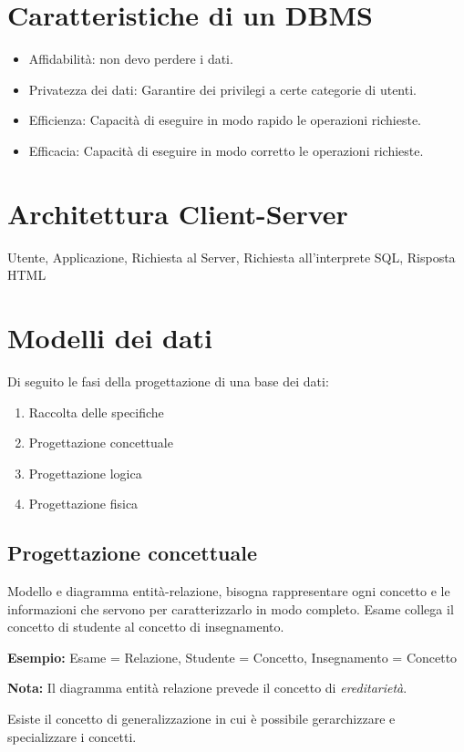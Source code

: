 \documentclass{article}
\begin{document}
\section{Caratteristiche di un DBMS}
\begin{itemize}
  \item Affidabilità: non devo perdere i dati.
  \item Privatezza dei dati: Garantire dei privilegi a certe categorie di utenti.
  \item Efficienza: Capacità di eseguire in modo rapido le operazioni richieste.
  \item Efficacia: Capacità di eseguire in modo corretto le operazioni richieste.
\end{itemize}

\section{Architettura Client-Server}
Utente, Applicazione, Richiesta al Server, Richiesta all'interprete SQL, Risposta HTML

\section{Modelli dei dati}
Di seguito le fasi della progettazione di una base dei dati:
\begin{enumerate}
  \item Raccolta delle specifiche
  \item Progettazione concettuale
  \item Progettazione logica
  \item Progettazione fisica
\end{enumerate}

\subsection{Progettazione concettuale}
Modello e diagramma entità-relazione, bisogna rappresentare ogni concetto e le informazioni che servono per caratterizzarlo in modo completo. Esame collega il concetto di studente al concetto di insegnamento.

\textbf{Esempio:} Esame = Relazione, Studente = Concetto, Insegnamento = Concetto

\textbf{Nota:} Il diagramma entità relazione prevede il concetto di \textit{ereditarietà}.

Esiste il concetto di generalizzazione in cui è possibile gerarchizzare e specializzare i concetti.
\end{document}
